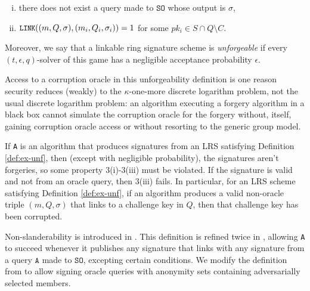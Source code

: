 \documentclass{llncs}
\begin{document}
\begin{definition}
\begin{enumerate}
\begin{enumerate}[(i)]
    \item there does not exist a query made to $\texttt{SO}$ whose output is $\sigma$,

    \item ${\small \texttt{LINK}((m, Q, \sigma), (m_i, Q_i, \sigma_i)) = 1}$ for some  $pk_i \in S \cap Q \setminus C$.
    \end{enumerate}
\end{enumerate}
Moreover, we say that a linkable ring signature scheme is \textit{unforgeable} if every $(t, \epsilon, q)$-solver of this game has a negligible acceptance probability $\epsilon$.
\end{definition}

\begin{remark}
Access to a corruption oracle in this unforgeability definition is one reason security reduces (weakly) to the $\kappa$-one-more discrete logarithm problem, not the usual discrete logarithm problem: an algorithm executing a forgery algorithm in a black box cannot simulate the corruption oracle for the forgery without, itself, gaining corruption oracle access or without resorting to the generic group model.
\end{remark}

\begin{remark}
If \texttt{A} is an algorithm that produces signatures from an LRS satisfying Definition \ref{def:ex-unf}, then (except with negligible probability), the signatures aren't forgeries, so some property 3(i)-3(iii) must be violated. If the signature is valid and not from an oracle query, then 3(iii) fails. In particular, for an LRS scheme satisfying Definition \ref{def:ex-unf}, if an algorithm produces a valid non-oracle triple $(m, Q, \sigma)$ that links to a challenge key in $Q$, then that challenge key has been corrupted.
\end{remark}

Non-slanderability is introduced in \cite{tsang2004separable}.  This definition is refined twice in \cite{au2006short}, allowing \texttt{A} to succeed whenever it publishes any signature that links with any signature from a query $\texttt{A}$ made to $\texttt{SO}$, excepting certain conditions. We modify the definition from \cite{au2006short} to allow signing oracle queries with anonymity sets containing adversarially selected members.
\end{document}
